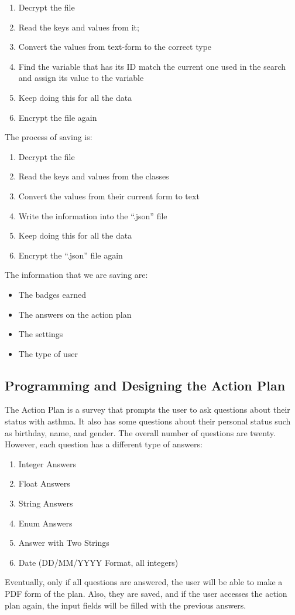 \begin{enumerate}
    \item{Decrypt the file}
    \item{Read the keys and values from it;}
    \item{Convert the values from text-form to the correct type}
    \item{Find the variable that has its ID match the current one used in the search and assign its value to the variable}
    
    \item{Keep doing this for all the data}
    \item{Encrypt the file again}
\end{enumerate}
The process of saving is:
\begin{enumerate}
    \item{Decrypt the file}
    \item{Read the keys and values from the classes}
    \item{Convert the values from their current form to text}
    \item{Write the information into the “.json” file}
    \item{Keep doing this for all the data}
    \item{Encrypt the “.json” file again}
\end{enumerate}
The information that we are saving are:
\begin{itemize}
    \item{The badges earned}
    \item{The answers on the action plan}
    \item{The settings}
    \item{The type of user}
\end{itemize}

\subsection{Programming and Designing the Action Plan}
The Action Plan is a survey that prompts the user to ask questions about their status with asthma. It also has some questions about their personal status such as birthday, name, and gender. The overall number of questions are twenty. However, each question has a different type of answers:
\begin{enumerate}
    \item{Integer Answers}
    \item{Float Answers}
    \item{String Answers}
    \item{Enum Answers}
    \item{Answer with Two Strings}
    \item{Date (DD/MM/YYYY Format, all integers)}
\end{enumerate}
Eventually, only if all questions are answered, the user will be able to make a PDF form of the plan. Also, they are saved, and if the user accesses the action plan again, the input fields will be filled with the previous answers.

